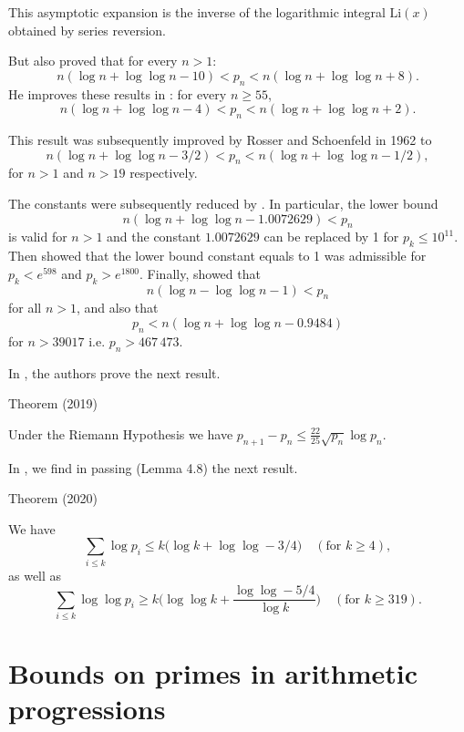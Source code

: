 This asymptotic expansion is the inverse of the logarithmic integral
$\mbox{Li}(x)$ obtained by series reversion. 


 But
\cite{Rosser*38}
also proved  that for every $n> 1$:
$$
n (\log n + \log \log n - 10) < p_n < n (\log n + \log\log n +8).
$$
He improves these results in
\cite{Rosser*41}
:  for every $n\geq 55$,
$$
n (\log n + \log \log n - 4) < p_n < n (\log n + \log\log n +2).
$$

 This result was subsequently improved by Rosser and Schoenfeld
\cite{Rosser-Schoenfeld*62}
 in 1962 to
$$
n (\log n + \log \log n - 3/2) < p_n < n (\log n + \log\log n -1/2),
$$
for $n > 1$ and $n > 19$  respectively.

The constants  were subsequently reduced by
\cite{Robin*83-1}.
In particular, the lower bound 
$$
n (\log n + \log \log n - 1.0072629) < p_n
$$
is valid for $n>1$ and the constant $1.0072629$ can be replaced by 1 for
$p_k\leq 10^{11}$.
Then 
\cite{Massias-Robin*96}
  showed that the lower bound constant equals to 1 was admissible for
$p_k < e^{598}$
and $p_k > e^{1800}$. Finally,  
\cite{Dusart*99-2}
showed
that
$$
  n(\log n - \log \log n - 1) < p_n
$$ for all $n > 1$, and also that
$$
p_n < n (\log n + \log\log n - 0.9484)
$$ for $n > 39017$ i.e. $p_n > 467\,473$.

In
\cite{Carneiro-Milinovich-Soundararajan*19},
the authors  prove the next result.
\begin{thm}{Theorem (2019)}

Under the Riemann Hypothesis we have $p_{n+1}-p_n\le\frac{22}{25}\sqrt{p_n}\log p_n$.
\end{thm}


\par 
\par 
In 
\cite{DeKoninck-Letendre*20},
we find in passing (Lemma 4.8) the next result.
\par 
\begin{thm}{Theorem (2020)}

  We have
  $$
  \sum_{i\le k}\log p_i\le
  k\bigl(\log k+\log\log -3/4\Bigr)\quad(\text{for $k\ge 4$}),
  $$
  as well as
  $$
  \sum_{i\le k}\log\log p_i\ge
  k\biggl(\log\log k+\frac{\log\log -5/4}{\log k}\biggr)
  \quad(\text{for $k\ge319$}).
  $$
\end{thm}









\section{Bounds on primes in arithmetic progressions}



